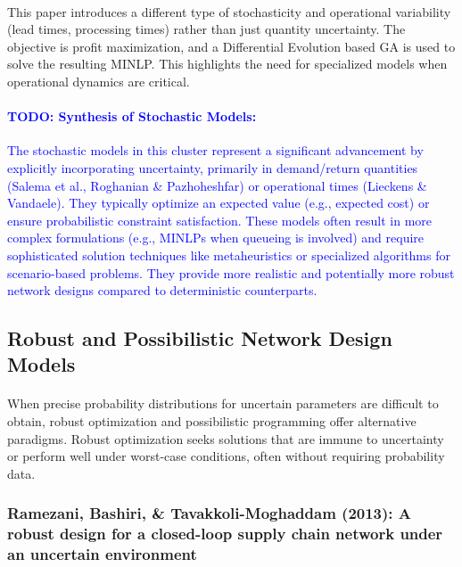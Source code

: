 \paragraph{} This paper introduces a different type of stochasticity and operational variability (lead times, processing times) rather than just quantity uncertainty. The objective is profit maximization, and a Differential Evolution based GA is used to solve the resulting MINLP. This highlights the need for specialized models when operational dynamics are critical.

\textcolor{blue}
{\paragraph{TODO: Synthesis of Stochastic Models:}
The stochastic models in this cluster represent a significant advancement by explicitly incorporating uncertainty, primarily in demand/return quantities (Salema et al., Roghanian \& Pazhoheshfar) or operational times (Lieckens \& Vandaele). They typically optimize an expected value (e.g., expected cost) or ensure probabilistic constraint satisfaction. These models often result in more complex formulations (e.g., MINLPs when queueing is involved) and require sophisticated solution techniques like metaheuristics or specialized algorithms for scenario-based problems. They provide more realistic and potentially more robust network designs compared to deterministic counterparts.}

\subsection{Robust and Possibilistic Network Design Models}
\paragraph{} When precise probability distributions for uncertain parameters are difficult to obtain, robust optimization and possibilistic programming offer alternative paradigms. Robust optimization seeks solutions that are immune to uncertainty or perform well under worst-case conditions, often without requiring probability data.

\subsubsection{Ramezani, Bashiri, \& Tavakkoli-Moghaddam (2013): A robust design for a closed-loop supply chain network under an uncertain environment}

